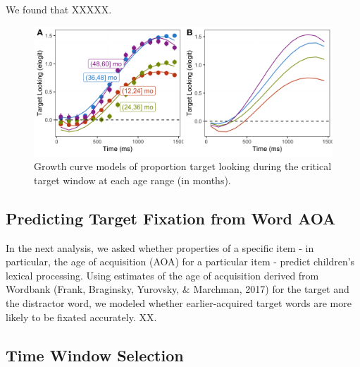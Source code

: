 \documentclass[10pt, letterpaper]{article}
\newenvironment{CodeChunk}{}{}
\begin{document}
We found that XXXXX.

\begin{figure}

{\centering \includegraphics[width = \textwidth]{figs/age_gca-1}

}

\caption[Growth curve models of proportion target looking during the critical target window at each age range (in months)]{Growth curve models of proportion target looking during the critical target window at each age range (in months).}\label{fig:age_gca}
\end{figure}

\hypertarget{predicting-target-fixation-from-word-aoa}{%
\subsection{Predicting Target Fixation from Word
AOA}\label{predicting-target-fixation-from-word-aoa}}

In the next analysis, we asked whether properties of a specific item -
in particular, the age of acquisition (AOA) for a particular item -
predict children's lexical processing. Using estimates of the age of
acquisition derived from Wordbank (Frank, Braginsky, Yurovsky, \&
Marchman, 2017) for the target and the distractor word, we modeled
whether earlier-acquired target words are more likely to be fixated
accurately. XX.

\hypertarget{time-window-selection}{%
\subsection{Time Window Selection}\label{time-window-selection}}
\end{document}
